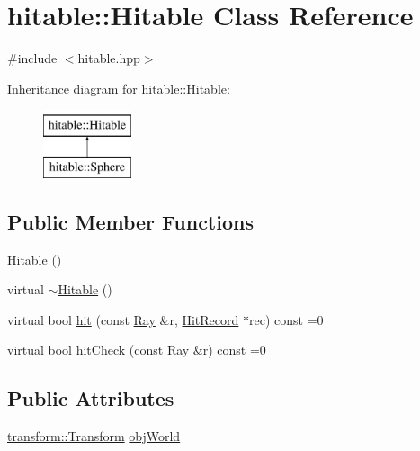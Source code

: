 \hypertarget{classhitable_1_1Hitable}{}\section{hitable\+::Hitable Class Reference}
\label{classhitable_1_1Hitable}


{\ttfamily \#include $<$hitable.\+hpp$>$}

Inheritance diagram for hitable\+::Hitable\+:\begin{figure}[H]
\begin{center}
\leavevmode
\includegraphics[height=2.000000cm]{classhitable_1_1Hitable}
\end{center}
\end{figure}
\subsection*{Public Member Functions}
\begin{DoxyCompactItemize}
\item 
\mbox{\hyperlink{classhitable_1_1Hitable_a37bb01dc7d96f6c08a6a18cec2041d88}{Hitable}} ()
\item 
virtual \mbox{\hyperlink{classhitable_1_1Hitable_a20bdcd63cb5135667d4feb77a910d815}{$\sim$\+Hitable}} ()
\item 
virtual bool \mbox{\hyperlink{classhitable_1_1Hitable_a6bc67aefe8669316b369e2034644bed0}{hit}} (const \mbox{\hyperlink{classRay}{Ray}} \&r, \mbox{\hyperlink{structhitable_1_1HitRecord}{Hit\+Record}} $\ast$rec) const =0
\item 
virtual bool \mbox{\hyperlink{classhitable_1_1Hitable_a749b7d827cd624ab6eacc1ab93a53e64}{hit\+Check}} (const \mbox{\hyperlink{classRay}{Ray}} \&r) const =0
\end{DoxyCompactItemize}
\subsection*{Public Attributes}
\begin{DoxyCompactItemize}
\item 
\mbox{\hyperlink{classtransform_1_1Transform}{transform\+::\+Transform}} \mbox{\hyperlink{classhitable_1_1Hitable_a53a8bbdc911d427245bcc7d34377d055}{obj\+World}}
\end{DoxyCompactItemize}


